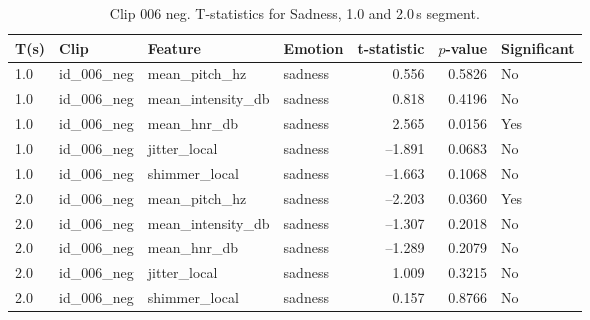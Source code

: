 \begin{table}
  \centering
  \begin{tabular}{l l l l r r l}
    \toprule
    T(s) & Clip           & Feature             & Emotion & t-statistic & $p$-value & Significant \\
    \midrule
    1.0 & id\_006\_neg & mean\_pitch\_hz     & sadness &  0.556 & 0.5826 & No  \\
    1.0 & id\_006\_neg & mean\_intensity\_db & sadness &  0.818 & 0.4196 & No  \\
    1.0 & id\_006\_neg & mean\_hnr\_db       & sadness &  2.565 & 0.0156 & Yes \\
    1.0 & id\_006\_neg & jitter\_local       & sadness & –1.891 & 0.0683 & No  \\
    1.0 & id\_006\_neg & shimmer\_local      & sadness & –1.663 & 0.1068 & No  \\
    2.0 & id\_006\_neg & mean\_pitch\_hz     & sadness & –2.203 & 0.0360 & Yes \\
    2.0 & id\_006\_neg & mean\_intensity\_db & sadness & –1.307 & 0.2018 & No  \\
    2.0 & id\_006\_neg & mean\_hnr\_db       & sadness & –1.289 & 0.2079 & No  \\
    2.0 & id\_006\_neg & jitter\_local       & sadness &  1.009 & 0.3215 & No  \\
    2.0 & id\_006\_neg & shimmer\_local      & sadness &  0.157 & 0.8766 & No  \\
    \bottomrule
  \end{tabular}
  \caption{Clip 006 neg. T-statistics for Sadness, 1.0 and 2.0\,s segment.}
  \label{tab:ttest_sadness_2s_006neg}
\end{table}

  
  